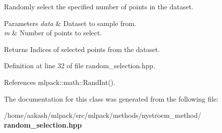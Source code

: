 Randomly select the specified number of points in the dataset. 


\begin{DoxyParams}{Parameters}
{\em data} & Dataset to sample from. \\
\hline
{\em m} & Number of points to select. \\
\hline
\end{DoxyParams}
\begin{DoxyReturn}{Returns}
Indices of selected points from the dataset. 
\end{DoxyReturn}


Definition at line 32 of file random\+\_\+selection.\+hpp.



References mlpack\+::math\+::\+Rand\+Int().



The documentation for this class was generated from the following file\+:\begin{DoxyCompactItemize}
\item 
/home/aakash/mlpack/src/mlpack/methods/nystroem\+\_\+method/\textbf{ random\+\_\+selection.\+hpp}\end{DoxyCompactItemize}
